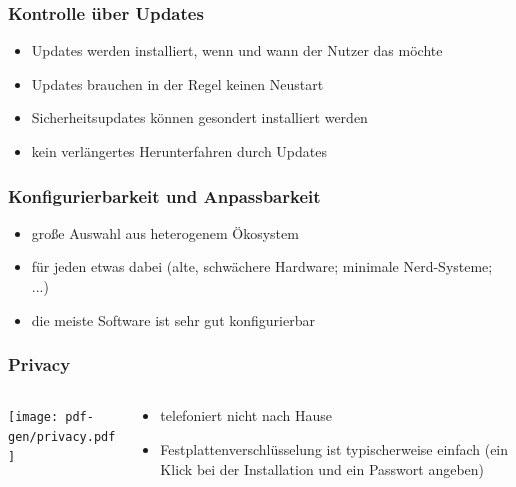 \documentclass[t]{beamer}
\begin{document}
\begin{frame}
  \frametitle{Kontrolle über Updates}
  \begin{itemize}
  \item Updates werden installiert, wenn und wann der Nutzer das möchte
  \item Updates brauchen in der Regel keinen Neustart
  \item Sicherheitsupdates können gesondert installiert werden
  \item kein verlängertes Herunterfahren durch Updates
  \end{itemize}
\end{frame}

\begin{frame}
  \frametitle{Konfigurierbarkeit und Anpassbarkeit}
  \begin{itemize}
  \item große Auswahl aus heterogenem Ökosystem
  \item für jeden etwas dabei (alte, schwächere Hardware; minimale
    Nerd-Systeme; ...)
  \item die meiste Software ist sehr gut konfigurierbar
  \end{itemize}
\end{frame}

\begin{frame}
  \frametitle{Privacy}
  \begin{columns}
    \begin{column}[T]{0.45\textwidth}
      \texttt{[image: pdf-gen/privacy.pdf]}
    \end{column}
    \begin{column}{0.45\textwidth}
      \begin{itemize}
      \item telefoniert nicht nach Hause
      \item Festplattenverschlüsselung ist typischerweise einfach (ein
        Klick bei der Installation und ein Passwort angeben)
      \end{itemize}
    \end{column}
  \end{columns}
\end{frame}
\end{document}
